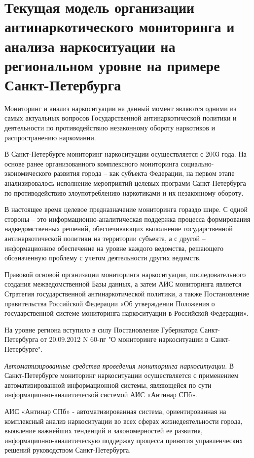 \section{Текущая модель организации антинаркотического мониторинга и анализа
наркоситуации на региональном уровне на примере Санкт-Петербурга}

Мониторинг и анализ наркоситуации на данный момент являются одними из самых
актуальных вопросов Государственной антинаркотической политики и деятельности по
противодействию незаконному обороту наркотиков и распространению наркомании. 

В Санкт-Петербурге мониторинг наркоситуации осуществляется с 2003 года. На
основе ранее организованного комплексного мониторинга социально-экономического
развития города – как субъекта Федерации, на первом этапе  анализировалось
исполнение мероприятий целевых программ Санкт-Петербурга по противодействию
злоупотреблению наркотиками и их незаконному обороту.

В настоящее время целевое предназначение мониторинга гораздо шире. С одной
стороны – это информационно-аналитическая поддержка процесса формирования
надведомственных решений, обеспечивающих выполнение государственной
антинаркотической политики на территории субъекта, а с другой – информационное
обеспечение на уровне каждого ведомства, решающего обозначенную проблему с
учетом деятельности других ведомств.

Правовой основой организации мониторинга наркоситуации, последовательного
создания межведомственной Базы данных, а затем АИС мониторинга является
Стратегия государственной антинаркотической политики, а также Постановление
правительства Российской Федерации «Об утверждении Положения о государственной
системе мониторинга наркоситуации в Российской Федерации».

На уровне региона вступило в силу Постановление Губернатора Санкт-Петербурга от
20.09.2012 N 60-пг "О мониторинге наркоситуации в Санкт-Петербурге".

\textit{Автоматизированные средства проведения мониторинга наркоситуации}.
В Санкт-Петербурге мониторинг наркоситуации осуществляется с применением
автоматизированной информационной системы, являющейся по сути
информационно-аналитической системой АИС «Антинар СПб».

АИС «Антинар СПб» - автоматизированная система, ориентированная  на комплексный
анализ наркоситуации во всех сферах  жизнедеятельности города, выявление
важнейших тенденций и закономерностей ее развития, информационно-аналитическую
поддержку процесса принятия управленческих решений руководством
Санкт-Петербурга.

